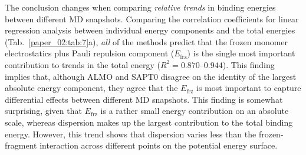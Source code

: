 The conclusion changes when comparing \emph{relative trends} in binding energies between different MD snapshots. Comparing the correlation coefficients for linear regression analysis between individual energy components and the total energies (Tab.~\ref{paper_02:tab:7}a), \emph{all} of the methods predict that the frozen monomer electrostatics plus Pauli repulsion component (\(E_{\text{frz}}\)) is the single most important contribution to trends in the total energy (\(R^2 = \numrange[range-phrase = --]{0.870}{0.944}\)). This finding implies that, although ALMO and SAPT0 disagree on the identity of the largest absolute energy component, they agree that the \(E_{\text{frz}}\) is most important to capture differential effects between different MD snapshots. This finding is somewhat surprising, given that \(E_{\text{frz}}\) is a rather small energy contribution on an absolute scale, whereas dispersion makes up the largest contribution to the total binding energy. However, this trend shows that dispersion varies less than the frozen-fragment interaction across different points on the potential energy surface.

